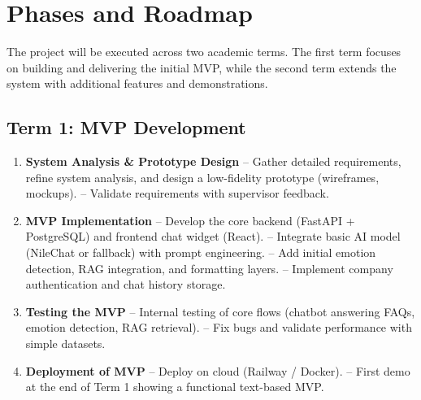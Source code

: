 \documentclass[20pt,a4paper]{article}
\begin{document}
\section{Phases and Roadmap}

The project will be executed across two academic terms.  
The first term focuses on building and delivering the initial MVP, while the second term extends the system with additional features and demonstrations.

\subsection*{Term 1: MVP Development}
\begin{enumerate}[leftmargin=*]
    \item \textbf{System Analysis \& Prototype Design}  
    -- Gather detailed requirements, refine system analysis, and design a low-fidelity prototype (wireframes, mockups).  
    -- Validate requirements with supervisor feedback.  

    \item \textbf{MVP Implementation}  
    -- Develop the core backend (FastAPI + PostgreSQL) and frontend chat widget (React).  
    -- Integrate basic AI model (NileChat or fallback) with prompt engineering.  
    -- Add initial emotion detection, RAG integration, and formatting layers.  
    -- Implement company authentication and chat history storage.  

    \item \textbf{Testing the MVP}  
    -- Internal testing of core flows (chatbot answering FAQs, emotion detection, RAG retrieval).  
    -- Fix bugs and validate performance with simple datasets.  

    \item \textbf{Deployment of MVP}  
    -- Deploy on cloud (Railway / Docker).  
    -- First demo at the end of Term 1 showing a functional text-based MVP.  
\end{enumerate}
\end{document}
